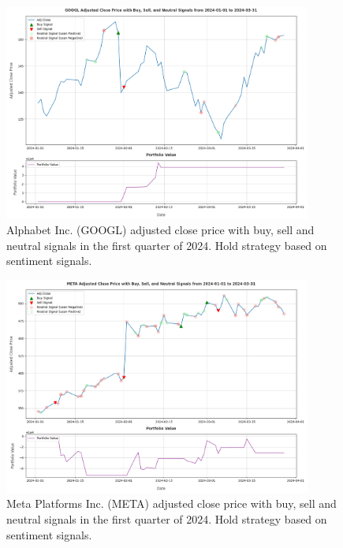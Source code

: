 \begin{figure}[ht]
  \centering
  \includegraphics[width=0.9\textwidth]{img/experiment-stock/googl-hold-strategy-neutral-a.pdf}
  \caption{Alphabet Inc. (GOOGL) adjusted close price with buy, sell and neutral signals in the first quarter of 2024. Hold strategy based on sentiment signals.}
  \label{fig:elsa-experiment-stock-googl-hold-strategy-neutral}
\end{figure}

\begin{figure}[ht]
    \centering
    \includegraphics[width=0.9\textwidth]{img/experiment-stock/meta-hold-strategy-neutral-a.pdf}
    \caption{Meta Platforms Inc. (META) adjusted close price with buy, sell and neutral signals in the first quarter of 2024. Hold strategy based on sentiment signals.}
    \label{fig:elsa-experiment-stock-meta-hold-strategy-neutral}
\end{figure}

